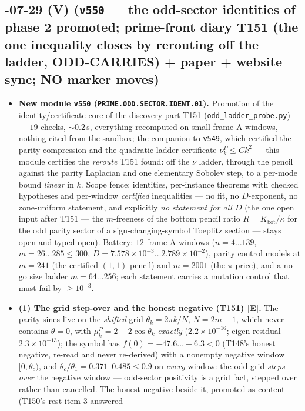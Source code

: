 \documentclass[11pt]{article}
\providecommand{\mE}{\textbf{[E]}}\providecommand{\mC}{\textbf{[C]}}
\begin{document}
\subsection*{-07-29 (V) (\texttt{v550} --- the odd-sector identities of phase 2 promoted; prime-front diary T151 (the one inequality closes by rerouting off the ladder, ODD-CARRIES) + paper + website sync; NO marker moves)}
\begin{itemize}[leftmargin=1.5em]
\item \textbf{New module \texttt{v550} (\texttt{PRIME.ODD.SECTOR.IDENT.01}).} Promotion of the
identity/certificate core of the discovery part T151 (\texttt{odd\_ladder\_probe.py}) --- $19$
checks, ${\sim}0.2$\,s, everything recomputed on small frame-A windows, nothing cited from the
sandbox; the companion to \texttt{v549}, which certified the parity compression and the
quadratic ladder certificate $\nu^P_k\le Ck^2$ --- this module certifies the \emph{reroute}
T151 found: off the $\nu$ ladder, through the pencil against the parity Laplacian and one
elementary Sobolev step, to a per-mode bound \emph{linear} in $k$. Scope fence: identities,
per-instance theorems with checked hypotheses and per-window \emph{certified} inequalities ---
no fit, no $D$-exponent, no zone-uniform statement, and explicitly \emph{no statement for all
$D$} (the one open input after T151 --- the $m$-freeness of the bottom pencil ratio
$R=K_{\mathrm{bot}}/\kappa$ for the odd parity sector of a sign-changing-symbol Toeplitz
section --- stays open and typed open). Battery: $12$ frame-A windows ($n=4\ldots139$,
$m=26\ldots285\le300$, $D=7.578\times10^{-3}\ldots2.789\times10^{-2}$), parity control models
at $m=241$ (the certified $(1,1)$ pencil) and $m=2001$ (the $\pi$ price), and a no-go size
ladder $m=64\ldots256$; each statement carries a mutation control that must fail by
$\ge10^{-3}$.
\item \textbf{(1) The grid step-over and the honest negative (T151) \mE.} The parity sines
live on the \emph{shifted} grid $\theta_k=2\pi k/N$, $N=2m{+}1$, which never contains
$\theta=0$, with $\mu^P_k=2-2\cos\theta_k$ \emph{exactly} ($2.2\times10^{-16}$; eigen-residual
$2.3\times10^{-13}$); the symbol has $f(0)=-47.6\ldots-6.3<0$ (T148's honest negative, re-read
and never re-derived) with a nonempty negative window $[0,\theta_c)$, and
$\theta_c/\theta_1=0.371$--$0.485\le0.9$ on \emph{every} window: the odd grid \emph{steps over}
the negative window --- odd-sector positivity is a grid fact, stepped over rather than
cancelled. The honest negative beside it, promoted as content (T150's rest item 3 answered

\end{itemize}
\end{document}

